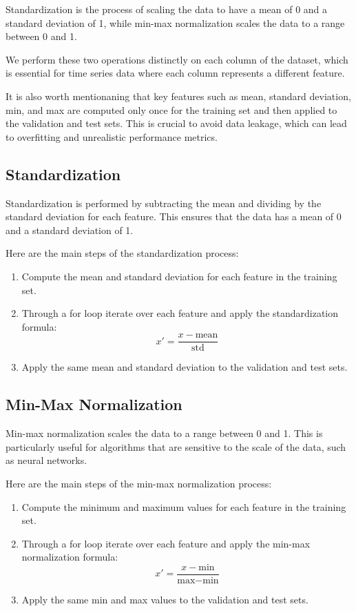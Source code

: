 \documentclass[review]{AIM_report}
\begin{document}
Standardization is the process of scaling the data to have a mean of 0 and a standard deviation of 1, while min-max normalization scales the data to a range between 0 and 1.

We perform these two operations distinctly on each column of the dataset, which is essential for time series data where each column represents a different feature.

It is also worth mentionaning that key features such as mean, standard deviation, min, and max are computed only once for the training set and then applied to the validation and test sets. This is crucial to avoid data leakage, which can lead to overfitting and unrealistic performance metrics.

\subsection{Standardization}

Standardization is performed by subtracting the mean and dividing by the standard deviation for each feature. This ensures that the data has a mean of 0 and a standard deviation of 1.

Here are the main steps of the standardization process:
\begin{enumerate}
    \item Compute the mean and standard deviation for each feature in the training set.
    \item Through a for loop iterate over each feature and apply the standardization formula:
          \begin{equation}
              x' = \frac{x - \text{mean}}{\text{std}}
          \end{equation}
    \item Apply the same mean and standard deviation to the validation and test sets.
\end{enumerate}

\subsection{Min-Max Normalization}
Min-max normalization scales the data to a range between 0 and 1. This is particularly useful for algorithms that are sensitive to the scale of the data, such as neural networks.

Here are the main steps of the min-max normalization process:
\begin{enumerate}
    \item Compute the minimum and maximum values for each feature in the training set.
    \item Through a for loop iterate over each feature and apply the min-max normalization formula:
          \begin{equation}
              x' = \frac{x - \text{min}}{\text{max} - \text{min}}
          \end{equation}
    \item Apply the same min and max values to the validation and test sets.
\end{enumerate}
\end{document}
